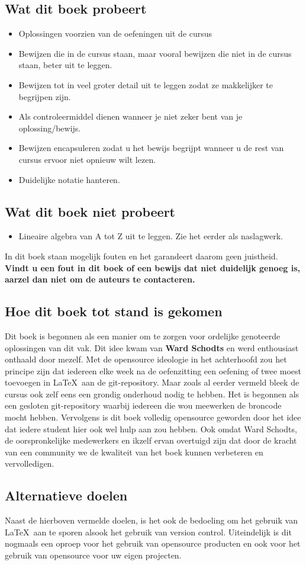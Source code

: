 \documentclass[lineaire_algebra_oplossingen.tex]{subfiles}
\begin{document}
\subsection*{Wat dit boek probeert}
\begin{itemize}
\item Oplossingen voorzien van de oefeningen uit de cursus
\item Bewijzen die in de cursus staan, maar vooral bewijzen die niet in de cursus staan, beter uit te leggen.
\item Bewijzen tot in veel groter detail uit te leggen zodat ze makkelijker te begrijpen zijn. 
\item Als controleermiddel dienen wanneer je niet zeker bent van je oplossing/bewijs.
\item Bewijzen encapsuleren zodat u het bewijs begrijpt wanneer u de rest van cursus ervoor niet opnieuw wilt lezen. 
\item Duidelijke notatie hanteren.
\end{itemize}
\subsection*{Wat dit boek niet probeert}
\begin{itemize}
\item Lineaire algebra van A tot Z uit te leggen. Zie het eerder als naslagwerk.
\end{itemize}
In dit boek staan mogelijk fouten en het garandeert daarom geen juistheid.
\textbf{Vindt u een fout in dit boek of een bewijs dat niet duidelijk genoeg is, aarzel dan niet om de auteurs te contacteren.}
\newpage
\subsection*{Hoe dit boek tot stand is gekomen}
Dit boek is begonnen als een manier om te zorgen voor ordelijke genoteerde oplossingen van dit vak.
Dit idee kwam van \textbf{Ward Schodts} en werd enthousiast onthaald door mezelf.
Met de opensource ideologie in het achterhoofd zou het principe zijn dat iedereen elke week na de oefenzitting een oefening of twee moest toevoegen in \LaTeX \ aan de git-repository.
Maar zoals al eerder vermeld bleek de cursus ook zelf eens een grondig onderhoud nodig te hebben.
Het is begonnen als een gesloten git-repository waarbij iedereen die wou meewerken de broncode mocht hebben.
Vervolgens is dit boek volledig opensource geworden door het idee dat iedere student hier ook wel hulp aan zou hebben.
Ook omdat Ward Schodts, de oorspronkelijke medewerkers en ikzelf ervan overtuigd zijn dat door de kracht van een community we de kwaliteit van het boek kunnen verbeteren en vervolledigen.

\subsection*{Alternatieve doelen}
Naast de hierboven vermelde doelen, is het ook de bedoeling om het gebruik van \LaTeX \ aan te sporen alsook het gebruik van version control.
Uiteindelijk is dit nogmaals een oproep voor het gebruik van opensource producten en ook voor het gebruik van opensource voor uw eigen projecten.
\end{document}
